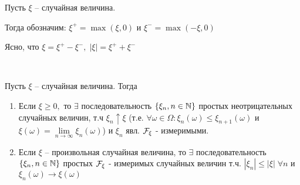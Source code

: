 
\begin{definition}
  Пусть $\xi$ -- случайная величина. 

  Тогда обозначим:
  $\xi^+ = \max(\xi, 0)$  и $\xi^- = \max(-\xi, 0)$

  Ясно, что $\xi = \xi^+ - \xi^-,\;  |\xi| = \xi^+ + \xi^-$
\end{definition}

\begin{theorem}~

  Пусть $\xi$ -- случайная величина. Тогда
  \begin{enumerate}
    \item 
      Если $\xi \geq 0, $ то $\exists$ последовательность $\{ \xi_n, n \in \mathbb{N} \}$ простых неотрицательных случайных величин, т.ч $\xi_n \uparrow \xi$
      (т.е. $\forall \omega \in \Omega : \xi_n(\omega) \leq \xi_{n+1}(\omega)$
      и $\xi(\omega) = \lim\limits_{n \to \infty} \xi_n(\omega)$) 
      и $\xi_n$ явл. $\mathcal{F}_\xi$ - измеримыми.

    \item 
      Если $\xi$ -- произвольная случайная величина, то $\exists$ последовательность 
      $\{ \xi_n, n \in \mathbb{N} \}$ простых $\mathcal{F}_\xi$ - измеримых случайных величин т.ч.  
      $|\xi_n| \leq |\xi| \; \forall n $ и $\xi_n(\omega) \to \xi(\omega)$
  \end{enumerate}
\end{theorem}

